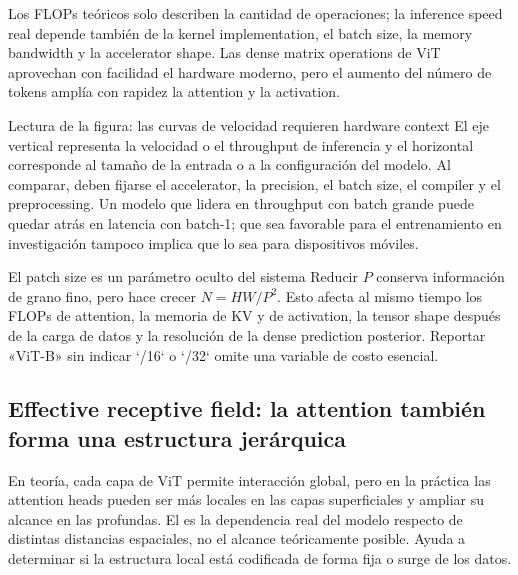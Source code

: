 Los FLOPs teóricos solo describen la cantidad de operaciones; la inference speed real depende también de la kernel implementation, el batch size, la memory bandwidth y la accelerator shape. Las dense matrix operations de ViT aprovechan con facilidad el hardware moderno, pero el aumento del número de tokens amplía con rapidez la attention y la activation.


\begin{knowledgebox}{Lectura de la figura: las curvas de velocidad requieren hardware context}
El eje vertical representa la velocidad o el throughput de inferencia y el horizontal corresponde al tamaño de la entrada o a la configuración del modelo. Al comparar, deben fijarse el accelerator, la precision, el batch size, el compiler y el preprocessing. Un modelo que lidera en throughput con batch grande puede quedar atrás en latencia con batch-1; que sea favorable para el entrenamiento en investigación tampoco implica que lo sea para dispositivos móviles.
\end{knowledgebox}

\begin{warningbox}{El patch size es un parámetro oculto del sistema}
Reducir $P$ conserva información de grano fino, pero hace crecer $N=HW/P^2$. Esto afecta al mismo tiempo los FLOPs de attention, la memoria de KV y de activation, la tensor shape después de la carga de datos y la resolución de la dense prediction posterior. Reportar «ViT-B» sin indicar `/16` o `/32` omite una variable de costo esencial.
\end{warningbox}

\subsection{Effective receptive field: la attention también forma una estructura jerárquica}

En teoría, cada capa de ViT permite interacción global, pero en la práctica las attention heads pueden ser más locales en las capas superficiales y ampliar su alcance en las profundas. El  es la dependencia real del modelo respecto de distintas distancias espaciales, no el alcance teóricamente posible. Ayuda a determinar si la estructura local está codificada de forma fija o surge de los datos.

